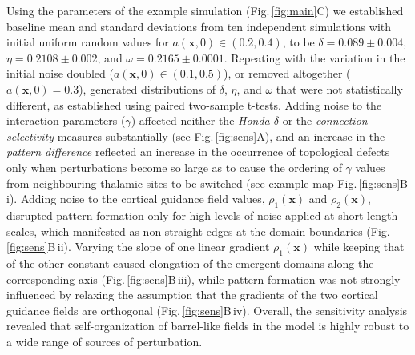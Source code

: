 \documentclass[9pt,lineno]{elife}
\newcommand{\MPthreeSens}[1]{\textcolor{colmpthreesens}{#1}}
\newcommand{\mb}[1]{\mathbf{#1}}
\begin{document}
\MPthreeSens{Using the parameters of the example simulation
  (Fig.\,\ref{fig:main}C) we established baseline mean and standard deviations
  from ten independent simulations with initial uniform random values for
  $a(\mb{x},0)\in(0.2,0.4)$, to be $\delta=0.089\pm 0.004$, $\eta=0.2108\pm
  0.002$, and $\omega=0.2165\pm 0.0001$. Repeating with the variation in the
  initial noise doubled ($a(\mb{x},0)\in(0.1,0.5)$), or removed altogether
  ($a(\mb{x},0)=0.3$), generated distributions of $\delta$, $\eta$, and
  $\omega$ that were not statistically different, as established using paired
  two-sample t-tests. Adding noise to the interaction parameters ($\gamma$)
  affected neither the \emph{Honda-}$\delta$ or the \emph{connection
    selectivity} measures substantially (see Fig.\,\ref{fig:sens}A), and an
  increase in the \emph{pattern difference} reflected an increase in the
  occurrence of topological defects only when perturbations become so large as
  to cause the ordering of $\gamma$ values from neighbouring thalamic sites to
  be switched (see example map Fig.\,\ref{fig:sens}B\,i). Adding noise to the
  cortical guidance field values, $\rho_1(\mathbf{x})$ and
  $\rho_2(\mathbf{x})$, disrupted pattern formation only for high levels of
  noise applied at short length scales, which manifested as non-straight edges
  at the domain boundaries (Fig.\,\ref{fig:sens}B\,ii). Varying the slope of one
  linear gradient $\rho_1(\mathbf{x})$ while keeping that of the other
  constant caused elongation of the emergent domains along the corresponding
  axis (Fig.\,\ref{fig:sens}B\,iii), while pattern formation was not strongly
  influenced by relaxing the assumption that the gradients of the two cortical
  guidance fields are orthogonal (Fig.\,\ref{fig:sens}B\,iv). Overall, the
  sensitivity analysis revealed that self-organization of barrel-like fields
  in the model is highly robust to a wide range of sources of perturbation.}
\end{document}
